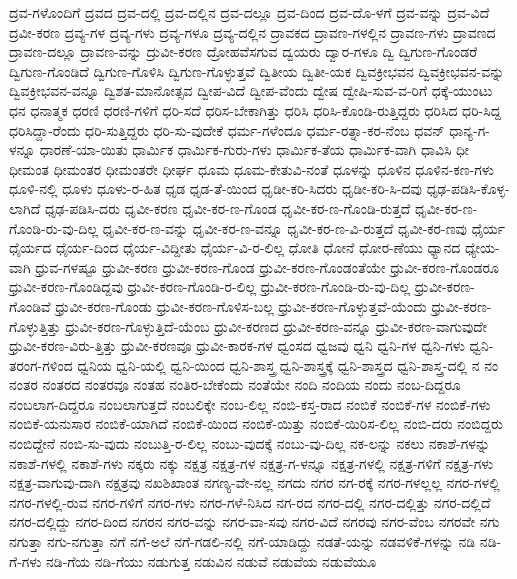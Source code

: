 {ದ್ರವ-ಗಳೊಂದಿಗೆ
ದ್ರವದ
ದ್ರವ-ದಲ್ಲಿ
ದ್ರವ-ದಲ್ಲಿನ
ದ್ರವ-ದಲ್ಲೂ
ದ್ರವ-ದಿಂದ
ದ್ರವ-ದೊ-ಳಗೆ
ದ್ರವ-ವನ್ನು
ದ್ರವ-ವಿದೆ
ದ್ರವೀ-ಕರಣ
ದ್ರವ್ಯ-ಗಳ
ದ್ರವ್ಯ-ಗಳು
ದ್ರವ್ಯ-ಗಳೂ
ದ್ರವ್ಯ-ದಲ್ಲಿನ
ದ್ರಾವಕದ
ದ್ರಾವಣ-ಗಳಲ್ಲಿನ
ದ್ರಾವಣ-ಗಳು
ದ್ರಾವಣದ
ದ್ರಾವಣ-ದಲ್ಲೂ
ದ್ರಾವಣ-ವನ್ನು
ದ್ರುವೀ-ಕರಣ
ದ್ರೋಹವೆಸಗುವ
ದ್ವಯರು
ದ್ವಾರ-ಗಳೂ
ದ್ವಿ
ದ್ವಿಗುಣ-ಗೊಂಡರೆ
ದ್ವಿಗುಣ-ಗೊಂಡಿದೆ
ದ್ವಿಗುಣ-ಗೊಳಿಸಿ
ದ್ವಿಗುಣ-ಗೊಳ್ಳುತ್ತವೆ
ದ್ವಿತೀಯ
ದ್ವಿತೀ-ಯಕ
ದ್ವಿವಕ್ರೀಭವನ
ದ್ವಿವಕ್ರೀಭವನ-ವನ್ನು
ದ್ವಿವಕ್ರೀಭವನ-ವನ್ನೂ
ದ್ವಿಶತ-ಮಾನೋತ್ಸವ
ದ್ವೀಪ-ವಿದೆ
ದ್ವೀಪ-ವೆಂದು
ದ್ವೇಷ
ದ್ವೇಷಿ-ಸುವ-ವ-ರಿಗೆ
ಧಕ್ಕೆ-ಯುಂಟು
ಧನ
ಧನಾತ್ಮಕ
ಧರಣಿ
ಧರಣಿ-ಗಳಿಗೆ
ಧರಿ-ಸದೆ
ಧರಿಸ-ಬೇಕಾಗಿತ್ತು
ಧರಿಸಿ
ಧರಿಸಿ-ಕೊಂಡಿ-ರುತ್ತಿದ್ದರು
ಧರಿಸಿದ
ಧರಿ-ಸಿದ್ದ
ಧರಿಸಿದ್ದಾ-ರೆಂದು
ಧರಿ-ಸುತ್ತಿದ್ದರು
ಧರಿ-ಸು-ವುದೇಕೆ
ಧರ್ಮ-ಗಳೆಂದೂ
ಧರ್ಮ-ರತ್ನಾ-ಕರ-ನೆಂಬ
ಧವನ್
ಧಾನ್ಯ-ಗ-ಳನ್ನೂ
ಧಾರಣೆ-ಯಾ-ಯಿತು
ಧಾರ್ಮಿಕ
ಧಾರ್ಮಿಕ-ಗುರು-ಗಳು
ಧಾರ್ಮಿಕ-ತೆಯ
ಧಾರ್ಮಿಕ-ವಾಗಿ
ಧಾವಿಸಿ
ಧೀ
ಧೀಮಂತ
ಧೀಮಂತರ
ಧೀಮಂತರೇ
ಧೀರ್ಘ
ಧೂಮ
ಧೂಮ-ಕೇತುವಿ-ನಂತೆ
ಧೂಳನ್ನು
ಧೂಳಿನ
ಧೂಳಿನ-ಕಣ-ಗಳು
ಧೂಳಿ-ನಲ್ಲಿ
ಧೂಳು
ಧೂಳು-ರ-ಹಿತ
ಧೃಡ
ಧೃಡ-ತೆ-ಯಿಂದ
ಧೃಡೀ-ಕರಿ-ಸಿದರು
ಧೃಡೀ-ಕರಿ-ಸಿ-ದವು
ಧೃಢ-ಪಡಿಸಿ-ಕೊಳ್ಳ-ಲಾಗಿದೆ
ಧೃಢ-ಪಡಿಸಿ-ದರು
ಧೃವೀ-ಕರಣ
ಧೃವೀ-ಕರ-ಣ-ಗೊಂಡ
ಧೃವೀ-ಕರ-ಣ-ಗೊಂಡಿ-ರುತ್ತದೆ
ಧೃವೀ-ಕರ-ಣ-ಗೊಂಡಿ-ರು-ವು-ದಿಲ್ಲ
ಧೃವೀ-ಕರ-ಣ-ವನ್ನು
ಧೃವೀ-ಕರ-ಣ-ವನ್ನೂ
ಧೃವೀ-ಕರ-ಣ-ವಿ-ರುತ್ತದೆ
ಧೃವೀ-ಕರ-ಣವು
ಧೈರ್ಯ
ಧೈರ್ಯದ
ಧೈರ್ಯ-ದಿಂದ
ಧೈರ್ಯ-ವಿದ್ದೀತು
ಧೈರ್ಯ-ವಿ-ರ-ಲಿಲ್ಲ
ಧೋತಿ
ಧೋನೆ
ಧೋರ-ಣೆಯು
ಧ್ಯಾನದ
ಧ್ಯೇಯ-ವಾಗಿ
ಧ್ರುವ-ಗಳಷ್ಟೂ
ಧ್ರುವೀ-ಕರಣ
ಧ್ರುವೀ-ಕರಣ-ಗೊಂಡ
ಧ್ರುವೀ-ಕರಣ-ಗೊಂಡಂತೆಯೇ
ಧ್ರುವೀ-ಕರಣ-ಗೊಂಡರೂ
ಧ್ರುವೀ-ಕರಣ-ಗೊಂಡಿದ್ದವು
ಧ್ರುವೀ-ಕರಣ-ಗೊಂಡಿ-ರ-ಲಿಲ್ಲ
ಧ್ರುವೀ-ಕರಣ-ಗೊಂಡಿ-ರು-ವು-ದಿಲ್ಲ
ಧ್ರುವೀ-ಕರಣ-ಗೊಂಡಿವೆ
ಧ್ರುವೀ-ಕರಣ-ಗೊಂಡು
ಧ್ರುವೀ-ಕರಣ-ಗೊಳಿಸ-ಬಲ್ಲ
ಧ್ರುವೀ-ಕರಣ-ಗೊಳ್ಳುತ್ತವೆ-ಯೆಂದು
ಧ್ರುವೀ-ಕರಣ-ಗೊಳ್ಳುತ್ತಿತ್ತು
ಧ್ರುವೀ-ಕರಣ-ಗೊಳ್ಳುತ್ತಿದೆ-ಯೆಂಬ
ಧ್ರುವೀ-ಕರಣದ
ಧ್ರುವೀ-ಕರಣ-ವನ್ನೂ
ಧ್ರುವೀ-ಕರಣ-ವಾಗುವುದೇ
ಧ್ರುವೀ-ಕರಣ-ವಿರು-ತ್ತಿತ್ತು
ಧ್ರುವೀ-ಕರಣವೂ
ಧ್ರುವೀ-ಕಾರಕ-ಗಳ
ಧ್ವಂಸದ
ಧ್ವಜವು
ಧ್ವನಿ
ಧ್ವನಿ-ಗಳ
ಧ್ವನಿ-ಗಳು
ಧ್ವನಿ-ತರಂಗ-ಗಳಿಂದ
ಧ್ವನಿಯ
ಧ್ವನಿ-ಯಲ್ಲಿ
ಧ್ವನಿ-ಯಿಂದ
ಧ್ವನಿ-ಶಾಸ್ತ್ರ
ಧ್ವನಿ-ಶಾಸ್ತ್ರಕ್ಕೆ
ಧ್ವನಿ-ಶಾಸ್ತ್ರದ
ಧ್ವನಿ-ಶಾಸ್ತ್ರ-ದಲ್ಲಿ
ನ
ನಂ
ನಂತರ
ನಂತರದ
ನಂತರವೂ
ನಂತಹ
ನಂತಿರ-ಬೇಕೆಂದು
ನಂತೆಯೇ
ನಂದಿ
ನಂದಿಯ
ನಂದು
ನಂಬ-ದಿದ್ದರೂ
ನಂಬಲಾಗ-ದಿದ್ದರೂ
ನಂಬಲಾಗುತ್ತದೆ
ನಂಬಲಿಕ್ಕೇ
ನಂಬ-ಲಿಲ್ಲ
ನಂಬಿ-ಕಸ್ತ-ರಾದ
ನಂಬಿಕೆ
ನಂಬಿಕೆ-ಗಳ
ನಂಬಿಕೆ-ಗಳು
ನಂಬಿಕೆ-ಯನುಸಾರ
ನಂಬಿಕೆ-ಯಾಗಿದೆ
ನಂಬಿಕೆ-ಯಿಂದ
ನಂಬಿಕೆ-ಯಿತ್ತು
ನಂಬಿಕೆ-ಯಿರಿಸ-ಲಿಲ್ಲ
ನಂಬಿ-ದರು
ನಂಬಿದ್ದರು
ನಂಬಿದ್ದೇನೆ
ನಂಬಿ-ಸು-ವುದು
ನಂಬುತ್ತಿ-ರ-ಲಿಲ್ಲ
ನಂಬು-ವುದಕ್ಕೆ
ನಂಬು-ವು-ದಿಲ್ಲ
ನಕ-ಲನ್ನು
ನಕಲು
ನಕಾಶೆ-ಗಳನ್ನು
ನಕಾಶೆ-ಗಳಲ್ಲಿ
ನಕಾಶೆ-ಗಳು
ನಕ್ಕರು
ನಕ್ಕು
ನಕ್ಷತ್ರ
ನಕ್ಷತ್ರ-ಗಳ
ನಕ್ಷತ್ರ-ಗ-ಳನ್ನೂ
ನಕ್ಷತ್ರ-ಗಳಲ್ಲಿ
ನಕ್ಷತ್ರ-ಗಳಿಗೆ
ನಕ್ಷತ್ರ-ಗಳು
ನಕ್ಷತ್ರ-ವಾಗುವು-ದಾಗಿ
ನಕ್ಷತ್ರವು
ನಖಶಿಖಾಂತ
ನಗಣ್ಯ-ವೇ-ನಲ್ಲ
ನಗದು
ನಗರ
ನಗ-ರಕ್ಕೆ
ನಗರ-ಗಳಲ್ಲಲ್ಲ
ನಗರ-ಗಳಲ್ಲಿ
ನಗರ-ಗಳಲ್ಲಿ-ರುವ
ನಗರ-ಗಳಿಗೆ
ನಗರ-ಗಳು
ನಗರ-ಗಳೆ-ನಿಸಿದ
ನಗ-ರದ
ನಗರ-ದಲ್ಲಿ
ನಗರ-ದಲ್ಲಿತ್ತು
ನಗರ-ದಲ್ಲಿದೆ
ನಗರ-ದಲ್ಲಿದ್ದು
ನಗರ-ದಿಂದ
ನಗರನ
ನಗರ-ವನ್ನು
ನಗರ-ವಾ-ಸವು
ನಗರ-ವಿದೆ
ನಗರವು
ನಗರ-ವೆಂಬ
ನಗರವೇ
ನಗು
ನಗುತ್ತಾ
ನಗು-ನಗುತ್ತಾ
ನಗೆ
ನಗೆ-ಅಲೆ
ನಗೆ-ಗಡಲಿ-ನಲ್ಲಿ
ನಗೆ-ಯಾಡಿದ್ದು
ನಡತೆ-ಯನ್ನು
ನಡವಳಿಕೆ-ಗಳನ್ನು
ನಡಿ
ನಡಿ-ಗೆ-ಗಳು
ನಡಿ-ಗೆಯ
ನಡಿ-ಗೆಯು
ನಡುಗುತ್ತ
ನಡುವಿನ
ನಡುವೆ
ನಡುವೆಯ
ನಡುವೆಯೂ
}
